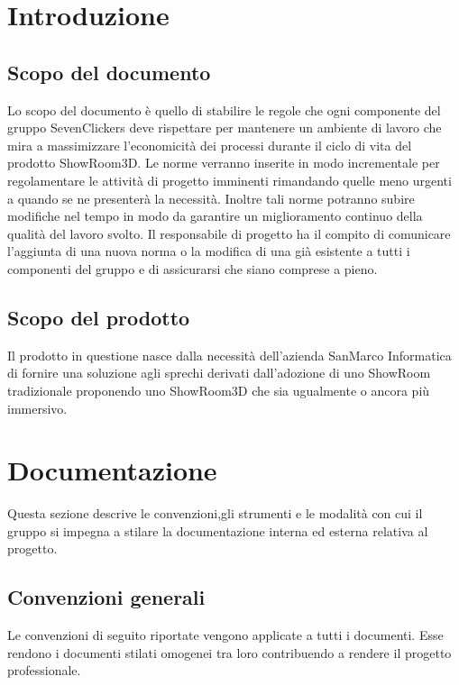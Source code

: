 \newcommand\myfontsize{\fontsize{13pt}{18pt}\selectfont}
\section{Introduzione}
\subsection{Scopo del documento}
Lo scopo del documento è quello di stabilire le regole che ogni componente del gruppo SevenClickers
deve rispettare per mantenere un ambiente di lavoro che mira a massimizzare
l'economicità dei processi durante il ciclo di vita del prodotto ShowRoom3D.
Le norme verranno inserite in modo incrementale per regolamentare le attività di progetto imminenti rimandando quelle meno urgenti a quando 
se ne presenterà la necessità.
Inoltre tali norme potranno subire modifiche nel tempo in modo da garantire un miglioramento continuo della qualità del lavoro svolto.
Il responsabile di progetto ha il compito di comunicare l'aggiunta di una nuova norma o la modifica di una già esistente a tutti i componenti
del gruppo e di assicurarsi che siano comprese a pieno.
\subsection{Scopo del prodotto}
Il prodotto in questione nasce dalla necessità dell'azienda SanMarco Informatica di fornire una soluzione agli sprechi
derivati dall'adozione di uno ShowRoom tradizionale proponendo uno ShowRoom3D che sia 
ugualmente o ancora più immersivo.


\section{Documentazione}
Questa sezione descrive le convenzioni,gli strumenti e le modalità con cui il gruppo si impegna a stilare la documentazione interna ed esterna relativa al progetto.
\subsection{Convenzioni generali}
Le convenzioni di seguito riportate vengono applicate a tutti i documenti.
Esse rendono i documenti stilati omogenei tra loro contribuendo a rendere il progetto professionale.


